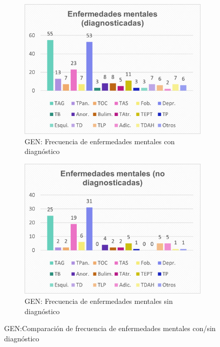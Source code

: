 \documentclass[12pt, a4paper,twoside,titlepage]{book}
\begin{document}
\begin{figure}
\centering
\begin{subfigure}{.5\textwidth}
  \centering
  \includegraphics[width=.95\linewidth]{ANEXO Gen/25AnexGENEnffem}
  \caption{GEN: Frecuencia de enfermedades mentales con diagnóstico}
\end{subfigure}%
\begin{subfigure}{.5\textwidth}
  \centering
  \includegraphics[width=.95\linewidth]{ANEXO Gen/26AnexGENEnffem}
  \caption{GEN: Frecuencia de enfermedades mentales sin diagnóstico}
\end{subfigure}
\caption{GEN:Comparación de frecuencia de enfermedades mentales con/sin diagnóstico}
\end{figure}
\end{document}

